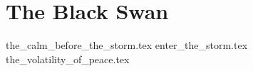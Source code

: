 \part{The Black Swan}

{the_calm_before_the_storm.tex}
{enter_the_storm.tex}
{the_volatility_of_peace.tex}